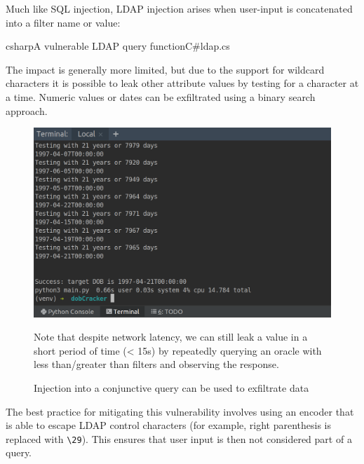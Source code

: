 Much like SQL injection, LDAP injection arises when user-input is concatenated into a filter name or value:

\newsavebox\myva
\begin{lrbox}{\myva}\begin{minipage}{\textwidth}
    \begin{mycodefile}{csharp}{\label{code:motivating:ldap:1}A vulnerable LDAP query function}{C\#}{ldap.cs}\end{mycodefile}
\end{minipage}\end{lrbox}



The impact is generally more limited, but due to the support for wildcard characters it is possible to leak other
attribute values by testing for a character at a time.
Numeric values or dates can be exfiltrated using a binary search approach.

\begin{figure}[H]
    \begin{MyMdframed}
        \vspace{0.5em}


        \caption{Injection into a conjunctive query can be used to exfiltrate data}
        \vspace{0.5em}
        \captionsetup{style=default}

        \begin{center}\includegraphics[width=0.5\linewidth]{dobcrack.png}\end{center}

        \vspace{0.5em}

        Note that despite network latency, we can still leak a value in a short period of time (< 15s) by
        repeatedly querying an oracle with less than/greater than filters and observing the response.
    \end{MyMdframed}
\end{figure}

The best practice for mitigating this vulnerability involves using an encoder that is able to escape LDAP control
characters (for example, right parenthesis is replaced with \texttt{\textbackslash 29}).
This ensures that user input is then not considered part of a query.

